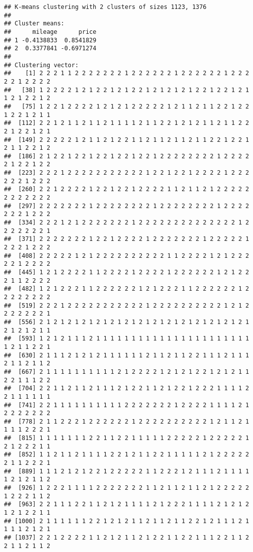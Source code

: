 \documentclass[
]{article}
\begin{document}
\begin{verbatim}
## K-means clustering with 2 clusters of sizes 1123, 1376
## 
## Cluster means:
##      mileage      price
## 1 -0.4138833  0.8541829
## 2  0.3377841 -0.6971274
## 
## Clustering vector:
##    [1] 2 2 2 1 1 2 2 2 2 2 2 2 1 2 2 2 2 2 2 1 2 2 2 2 2 2 1 2 2 2 2 2 1 2 2 2 2
##   [38] 1 2 2 2 2 1 2 1 2 2 1 2 1 2 2 1 2 1 2 1 2 1 2 2 1 2 2 1 2 1 1 2 1 2 2 1 2
##   [75] 1 2 2 1 2 2 2 2 1 2 1 2 1 2 2 2 2 2 1 2 1 1 2 1 1 2 2 1 2 2 1 2 2 1 2 1 1
##  [112] 2 2 1 2 1 1 2 1 1 2 1 1 1 1 2 1 1 2 2 1 2 1 2 1 1 2 1 1 2 2 2 1 2 2 1 2 1
##  [149] 2 2 2 2 2 1 2 1 1 2 1 2 2 1 1 2 1 1 2 1 1 2 1 1 2 2 1 2 2 1 2 1 1 2 2 1 2
##  [186] 2 1 2 2 1 2 2 1 2 2 1 2 2 1 2 2 1 2 2 2 2 2 2 2 2 1 2 2 2 2 2 1 2 2 1 2 2
##  [223] 2 2 2 1 2 2 2 2 2 2 2 2 2 2 2 1 2 2 1 2 2 1 2 2 2 2 1 2 2 2 2 2 2 1 2 2 2
##  [260] 2 2 1 2 2 2 2 1 2 2 1 2 2 1 2 2 2 2 1 1 2 1 1 2 1 2 2 2 2 2 2 2 2 2 2 2 2
##  [297] 2 2 2 2 2 2 2 1 2 2 2 2 2 2 2 2 1 2 2 2 2 2 2 2 2 1 2 2 2 2 2 2 2 1 2 2 2
##  [334] 2 2 2 1 2 1 2 2 2 2 2 2 2 1 2 2 2 2 2 2 2 2 2 2 2 2 2 2 1 2 2 2 2 2 2 2 1
##  [371] 2 2 2 2 2 2 2 1 2 2 1 2 2 2 2 1 2 2 2 2 2 2 2 1 2 2 2 2 2 1 2 2 2 1 2 2 2
##  [408] 2 2 2 2 2 1 2 1 2 2 2 2 2 2 2 2 2 2 1 1 2 2 2 2 1 2 1 2 2 2 2 2 1 2 2 2 2
##  [445] 1 2 1 2 2 2 2 1 1 2 2 2 2 1 2 2 2 2 1 2 2 2 2 2 2 1 2 1 2 2 2 1 1 2 2 2 2
##  [482] 1 2 1 2 2 2 1 1 2 2 2 2 2 2 1 2 1 2 2 2 1 1 2 2 2 2 2 2 1 2 2 2 2 2 2 2 2
##  [519] 2 2 2 1 2 2 2 2 2 2 2 2 2 2 2 1 2 2 2 2 2 2 2 2 2 2 1 2 1 2 2 2 2 2 2 2 1
##  [556] 2 1 2 1 2 1 2 1 2 1 2 1 2 1 2 1 2 1 2 1 2 1 2 1 2 1 2 1 2 1 2 1 2 1 2 1 1
##  [593] 1 2 1 2 1 1 1 2 1 1 1 1 1 1 1 1 1 1 1 1 1 1 1 1 1 1 1 1 1 1 1 2 1 1 2 2 1
##  [630] 2 1 1 1 2 1 2 1 2 1 1 1 1 1 1 2 1 1 2 1 1 2 2 1 1 1 2 1 1 1 2 1 1 2 1 1 2
##  [667] 2 1 1 1 1 1 1 1 1 1 1 2 1 2 2 2 2 1 2 1 2 1 2 2 1 2 1 2 1 1 2 2 1 1 1 2 2
##  [704] 2 2 1 1 2 1 1 2 1 1 1 2 1 2 2 1 1 2 1 2 2 1 2 2 2 1 1 1 1 2 2 1 1 1 1 1 1
##  [741] 2 2 1 1 1 1 1 1 1 1 1 1 2 2 2 2 2 2 2 1 2 2 2 2 1 1 1 1 2 1 2 2 2 2 2 2 2
##  [778] 2 1 1 2 2 2 1 2 2 2 2 2 2 1 2 2 2 2 2 2 2 2 2 2 1 2 1 1 2 1 1 1 1 2 2 2 1
##  [815] 1 1 1 1 1 1 1 2 2 1 1 2 2 1 1 1 1 1 2 2 2 2 2 1 2 2 2 2 2 1 2 1 2 2 2 1 1
##  [852] 1 1 2 1 1 2 1 1 1 1 2 2 1 2 1 1 2 2 1 1 1 1 1 2 1 2 2 2 2 2 2 1 1 2 2 2 1
##  [889] 1 1 1 2 1 2 1 2 2 1 2 2 2 2 2 1 1 2 2 2 1 2 1 1 1 2 1 1 1 1 1 2 1 2 1 1 2
##  [926] 1 2 2 2 1 1 1 1 2 2 2 2 2 2 2 1 1 2 1 1 2 1 1 2 1 2 2 2 2 2 1 2 2 2 1 1 2
##  [963] 2 2 1 1 1 2 2 1 1 2 1 2 1 1 1 1 2 1 2 2 2 1 1 1 1 2 1 2 1 2 1 2 1 2 2 1 1
## [1000] 2 1 1 1 1 1 1 2 2 1 2 1 2 1 1 2 1 1 2 1 1 2 2 1 2 1 1 1 2 1 1 1 1 2 1 2 1
## [1037] 2 2 1 2 2 2 2 1 1 2 1 2 1 1 2 1 2 2 1 1 2 2 1 1 1 2 2 1 1 2 2 1 1 2 1 1 2

\end{verbatim}
\end{document}
